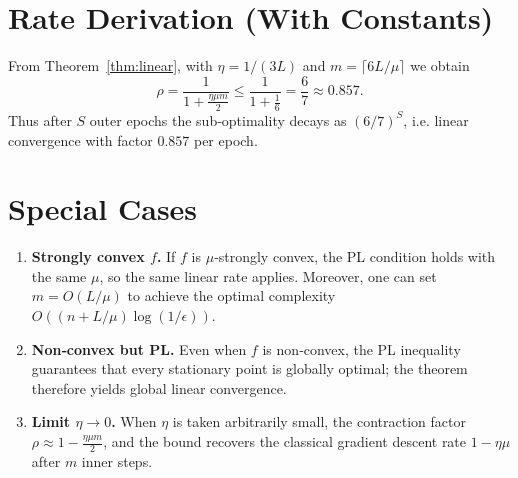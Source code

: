 \documentclass{article}
\begin{document}
\section*{Rate Derivation (With Constants)}
From Theorem~\ref{thm:linear}, with $\eta=1/(3L)$ and $m= \lceil 6L/\mu\rceil$ we obtain
\[
\rho = \frac{1}{1+\frac{\eta\mu m}{2}}
      \le \frac{1}{1+\frac{1}{6}}
      = \frac{6}{7}\approx0.857 .
\]
Thus after $S$ outer epochs the sub‑optimality decays as $(6/7)^{S}$, i.e. linear convergence with factor $0.857$ per epoch.

\section*{Special Cases}
\begin{enumerate}[label=\alph*.]
\item \textbf{Strongly convex $f$.}  
If $f$ is $\mu$‑strongly convex, the PL condition holds with the same $\mu$, so the same linear rate applies. Moreover, one can set $m=O(L/\mu)$ to achieve the optimal complexity $O((n+L/\mu)\log(1/\epsilon))$.
\item \textbf{Non‑convex but PL.}  
Even when $f$ is non‑convex, the PL inequality guarantees that every stationary point is globally optimal; the theorem therefore yields global linear convergence.
\item \textbf{Limit $\eta\to 0$.}  
When $\eta$ is taken arbitrarily small, the contraction factor $\rho\approx 1-\frac{\eta\mu m}{2}$, and the bound recovers the classical gradient descent rate $1-\eta\mu$ after $m$ inner steps.
\end{enumerate}
\end{document}

